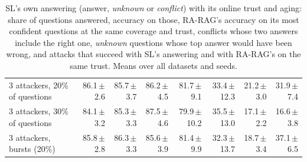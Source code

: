 \begin{table}
\begin{tabular}{@{}lrrrrrrr@{}}
3 attackers, 20\% of questions & 86.1\,{\scriptsize$\pm$2.6} & 85.7\,{\scriptsize$\pm$3.7} & 86.2\,{\scriptsize$\pm$4.5} & 81.7\,{\scriptsize$\pm$9.1} & 33.4\,{\scriptsize$\pm$12.3} & 21.2\,{\scriptsize$\pm$3.0} & 31.9\,{\scriptsize$\pm$7.4} \\
3 attackers, 30\% of questions & 84.1\,{\scriptsize$\pm$3.2} & 85.3\,{\scriptsize$\pm$3.3} & 87.5\,{\scriptsize$\pm$4.6} & 79.9\,{\scriptsize$\pm$10.2} & 35.5\,{\scriptsize$\pm$13.0} & 17.1\,{\scriptsize$\pm$2.2} & 16.6\,{\scriptsize$\pm$3.8} \\
3 attackers, bursts (20\%) & 85.8\,{\scriptsize$\pm$2.8} & 86.3\,{\scriptsize$\pm$3.3} & 85.6\,{\scriptsize$\pm$3.9} & 81.4\,{\scriptsize$\pm$9.9} & 32.3\,{\scriptsize$\pm$13.7} & 18.7\,{\scriptsize$\pm$3.4} & 37.1\,{\scriptsize$\pm$6.5} \\
\bottomrule
\end{tabular}
\caption{SL's own answering (answer, \emph{unknown} or \emph{conflict}) with its online trust and aging: share of questions answered, accuracy on those, RA-RAG's accuracy on its most confident questions at the same coverage and trust, conflicts whose two answers include the right one, \emph{unknown} questions whose top answer would have been wrong, and attacks that succeed with SL's answering and with RA-RAG's on the same trust. Means over all datasets and seeds.}
\label{tab:answering}
\end{table}
